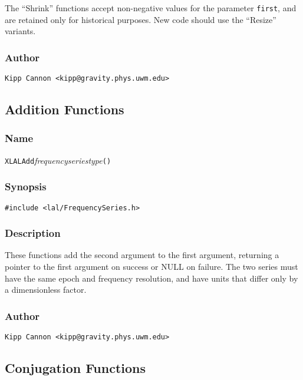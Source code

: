 The ``Shrink'' functions accept non-negative values for the parameter
\texttt{first}, and are retained only for historical purposes.  New code
should use the ``Resize'' variants.

\subsubsection{Author}

\verb|Kipp Cannon <kipp@gravity.phys.uwm.edu>|


\subsection{Addition Functions}

\subsubsection{Name}

\texttt{XLALAdd}\textit{frequencyseriestype}\texttt{()}

\subsubsection{Synopsis}

\begin{verbatim}
#include <lal/FrequencySeries.h>
\end{verbatim}


\subsubsection{Description}

These functions add the second argument to the first argument, returning a
pointer to the first argument on success or NULL on failure.  The two
series must have the same epoch and frequency resolution, and have units
that differ only by a dimensionless factor.

\subsubsection{Author}

\verb|Kipp Cannon <kipp@gravity.phys.uwm.edu>|


\subsection{Conjugation Functions}

